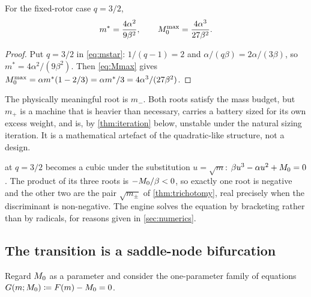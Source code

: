 \begin{corollary}[Closed forms at $q=3/2$]
\label{cor:closedform}
For the fixed-rotor case $q=3/2$,
\begin{equation}
  m^{*} = \frac{4\alpha^{2}}{9\beta^{2}},
  \qquad
  M_0^{\max} = \frac{4\alpha^{3}}{27\beta^{2}} .
  \label{eq:closedform}
\end{equation}
\end{corollary}

\begin{proof}
Put $q=3/2$ in \cref{eq:mstar}: $1/(q-1)=2$ and $\alpha/(q\beta)
= 2\alpha/(3\beta)$, so $m^* = 4\alpha^2/(9\beta^2)$. Then \cref{eq:Mmax} gives
$M_0^{\max} = \alpha m^*(1-2/3) = \alpha m^*/3 = 4\alpha^3/(27\beta^2)$.
\end{proof}

\begin{remark}
The physically meaningful root is $m_-$. Both roots satisfy the mass budget,
but $m_+$ is a machine that is heavier than necessary, carries a battery sized
for its own excess weight, and is, by \cref{thm:iteration} below, unstable
under the natural sizing iteration. It is a mathematical artefact of the
quadratic-like structure, not a design.
\end{remark}

\begin{remark}
 at $q=3/2$ becomes a cubic under the substitution
$u=\sqrt m$: $\beta u^3 - \alpha u^2 + M_0 = 0$. The product of its three
roots is $-M_0/\beta<0$, so exactly one root is negative and the other two
are the pair $\sqrt{m_\pm}$ of \cref{thm:trichotomy}, real precisely when the
discriminant is non-negative. The engine solves the equation by bracketing
rather than by radicals, for reasons given in \cref{sec:numerics}.
\end{remark}

\subsection{The transition is a saddle-node bifurcation}

Regard $M_0$ as a parameter and consider the one-parameter family of
equations $G(m;M_0) \coloneqq F(m)-M_0 = 0$.

